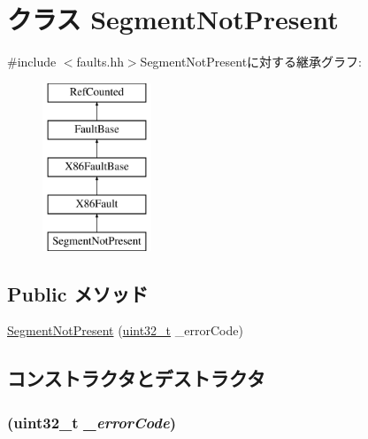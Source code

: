 \hypertarget{classX86ISA_1_1SegmentNotPresent}{
\section{クラス SegmentNotPresent}
\label{classX86ISA_1_1SegmentNotPresent}
}


{\ttfamily \#include $<$faults.hh$>$}SegmentNotPresentに対する継承グラフ:\begin{figure}[H]
\begin{center}
\leavevmode
\includegraphics[height=5cm]{classX86ISA_1_1SegmentNotPresent}
\end{center}
\end{figure}
\subsection*{Public メソッド}
\begin{DoxyCompactItemize}
\item 
\hyperlink{classX86ISA_1_1SegmentNotPresent_aadfa7e740b751b48b6d1dc8b25b410bb}{SegmentNotPresent} (\hyperlink{Type_8hh_a435d1572bf3f880d55459d9805097f62}{uint32\_\-t} \_\-errorCode)
\end{DoxyCompactItemize}


\subsection{コンストラクタとデストラクタ}
\hypertarget{classX86ISA_1_1SegmentNotPresent_aadfa7e740b751b48b6d1dc8b25b410bb}{
\subsubsection[{SegmentNotPresent}]{ ({\bf uint32\_\-t} {\em \_\-errorCode})}}
\label{classX86ISA_1_1SegmentNotPresent_aadfa7e740b751b48b6d1dc8b25b410bb}



